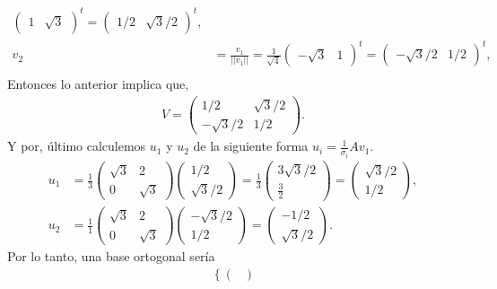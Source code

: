 \documentclass[11pt,letterpaper]{article}
\begin{document}
\begin{enumerate}
\begin{align*}
\begin{pmatrix}
1 & \sqrt{3} 
\end{pmatrix}^t = \begin{pmatrix}
1/2 & \sqrt{3}/2 
\end{pmatrix}^t,\\
v_2&= \frac{v_1}{||v_1||} =\frac{1}{\sqrt{4}} \begin{pmatrix}
-\sqrt{3}& 1
\end{pmatrix}^t = \begin{pmatrix}
-\sqrt{3}/2 & 1/2
\end{pmatrix}^t,\\
\end{align*}
Entonces lo anterior implica que,
\begin{align*}
V= \begin{pmatrix}
1/2 & \sqrt{3}/ 2\\
-\sqrt{3}/2 & 1/2
\end{pmatrix}.
\end{align*}
Y por, último calculemos $u_1$ y $u_2$ de la siguiente forma
$u_i= \frac{1}{\sigma_i} A v_1.$
\begin{align*}
u_1&=\frac{1}{3} \begin{pmatrix}
\sqrt{3} & 2\\
0 & \sqrt{3}
\end{pmatrix}\begin{pmatrix}
1/2\\
\sqrt{3}/2
\end{pmatrix}= \frac{1}{3}\begin{pmatrix}
3\sqrt{3}/2\\
\frac{3}{2}
\end{pmatrix}=\begin{pmatrix}
\sqrt{3}/2\\
1/2
\end{pmatrix},\\
u_2&=\frac{1}{1} \begin{pmatrix}
\sqrt{3} & 2\\
0 & \sqrt{3}
\end{pmatrix}\begin{pmatrix}
-\sqrt{3}/2\\
1/2
\end{pmatrix}=\begin{pmatrix}
-1/2\\
\sqrt{3}/2
\end{pmatrix}.
\end{align*}
Por lo tanto, una base ortogonal sería 
\begin{align*}
\left\{\begin{pmatrix}

\end{pmatrix}
\end{align*}
\end{enumerate}
\end{document}
